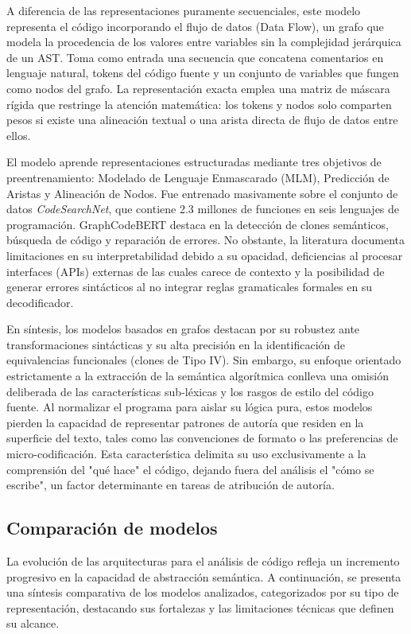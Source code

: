 A diferencia de las representaciones puramente secuenciales, este modelo representa el código incorporando el flujo de datos (Data Flow), un grafo que modela la procedencia de los valores entre variables sin la complejidad jerárquica de un AST. Toma como entrada una secuencia que concatena comentarios en lenguaje natural, tokens del código fuente y un conjunto de variables que fungen como nodos del grafo. La representación exacta emplea una matriz de máscara rígida que restringe la atención matemática: los tokens y nodos solo comparten pesos si existe una alineación textual o una arista directa de flujo de datos entre ellos.

El modelo aprende representaciones estructuradas mediante tres objetivos de preentrenamiento: Modelado de Lenguaje Enmascarado (MLM), Predicción de Aristas y Alineación de Nodos. Fue entrenado masivamente sobre el conjunto de datos \textit{CodeSearchNet}, que contiene 2.3 millones de funciones en seis lenguajes de programación. GraphCodeBERT destaca en la detección de clones semánticos, búsqueda de código y reparación de errores. No obstante, la literatura documenta limitaciones en su interpretabilidad debido a su opacidad, deficiencias al procesar interfaces (APIs) externas de las cuales carece de contexto y la posibilidad de generar errores sintácticos al no integrar reglas gramaticales formales en su decodificador.


En síntesis, los modelos basados en grafos destacan por su robustez ante transformaciones sintácticas y su alta precisión en la identificación de equivalencias funcionales (clones de Tipo IV). Sin embargo, su enfoque orientado estrictamente a la extracción de la semántica algorítmica conlleva una omisión deliberada de las características sub-léxicas y los rasgos de estilo del código fuente. Al normalizar el programa para aislar su lógica pura, estos modelos pierden la capacidad de representar patrones de autoría que residen en la superficie del texto, tales como las convenciones de formato o las preferencias de micro-codificación. Esta característica delimita su uso exclusivamente a la comprensión del "qué hace" el código, dejando fuera del análisis el "cómo se escribe", un factor determinante en tareas de atribución de autoría.


\subsection{Comparación de modelos}

La evolución de las arquitecturas para el análisis de código refleja un incremento progresivo en la capacidad de abstracción semántica. A continuación, se presenta una síntesis comparativa de los modelos analizados, categorizados por su tipo de representación, destacando sus fortalezas y las limitaciones técnicas que definen su alcance.

